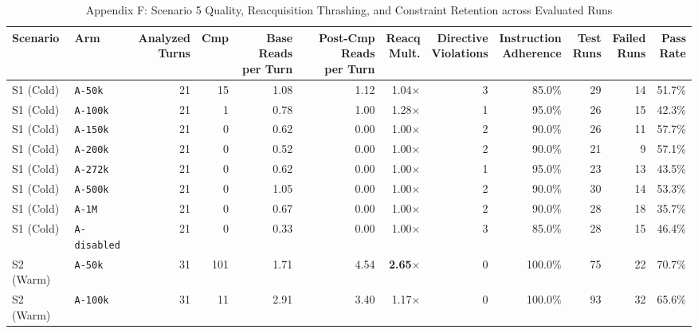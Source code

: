 \documentclass[10pt,twocolumn,a4paper]{article}
\begin{document}
\begin{table}[t]
\caption{Appendix F: Scenario 5 Quality, Reacquisition Thrashing, and Constraint Retention across Evaluated Runs}
\label{tab:app_scenario5_quality}
\centering
\scriptsize
\setlength{\tabcolsep}{2.2pt}
\begin{tabular}{@{}llrrrrrrrrrr@{}}
\toprule
\textbf{Scenario} & \textbf{Arm} & \shortstack{\textbf{Analyzed}\\\textbf{Turns}} & \textbf{Cmp} & \shortstack{\textbf{Base Reads}\\\textbf{per Turn}} & \shortstack{\textbf{Post-Cmp Reads}\\\textbf{per Turn}} & \shortstack{\textbf{Reacq}\\\textbf{Mult.}} & \shortstack{\textbf{Directive}\\\textbf{Violations}} & \shortstack{\textbf{Instruction}\\\textbf{Adherence}} & \shortstack{\textbf{Test}\\\textbf{Runs}} & \shortstack{\textbf{Failed}\\\textbf{Runs}} & \shortstack{\textbf{Pass}\\\textbf{Rate}} \\
\midrule
S1 (Cold) & \texttt{A-50k} & 21 & 15 & 1.08 & 1.12 & 1.04$\times$ & 3 & 85.0\% & 29 & 14 & 51.7\% \\
S1 (Cold) & \texttt{A-100k} & 21 & 1 & 0.78 & 1.00 & 1.28$\times$ & 1 & 95.0\% & 26 & 15 & 42.3\% \\
S1 (Cold) & \texttt{A-150k} & 21 & 0 & 0.62 & 0.00 & 1.00$\times$ & 2 & 90.0\% & 26 & 11 & 57.7\% \\
S1 (Cold) & \texttt{A-200k} & 21 & 0 & 0.52 & 0.00 & 1.00$\times$ & 2 & 90.0\% & 21 & 9 & 57.1\% \\
S1 (Cold) & \texttt{A-272k} & 21 & 0 & 0.62 & 0.00 & 1.00$\times$ & 1 & 95.0\% & 23 & 13 & 43.5\% \\
S1 (Cold) & \texttt{A-500k} & 21 & 0 & 1.05 & 0.00 & 1.00$\times$ & 2 & 90.0\% & 30 & 14 & 53.3\% \\
S1 (Cold) & \texttt{A-1M} & 21 & 0 & 0.67 & 0.00 & 1.00$\times$ & 2 & 90.0\% & 28 & 18 & 35.7\% \\
S1 (Cold) & \texttt{A-disabled} & 21 & 0 & 0.33 & 0.00 & 1.00$\times$ & 3 & 85.0\% & 28 & 15 & 46.4\% \\
\midrule
S2 (Warm) & \texttt{A-50k} & 31 & 101 & 1.71 & 4.54 & \textbf{2.65$\times$} & 0 & 100.0\% & 75 & 22 & 70.7\% \\
S2 (Warm) & \texttt{A-100k} & 31 & 11 & 2.91 & 3.40 & 1.17$\times$ & 0 & 100.0\% & 93 & 32 & 65.6\% \\

\end{tabular}
\end{table}
\end{document}
